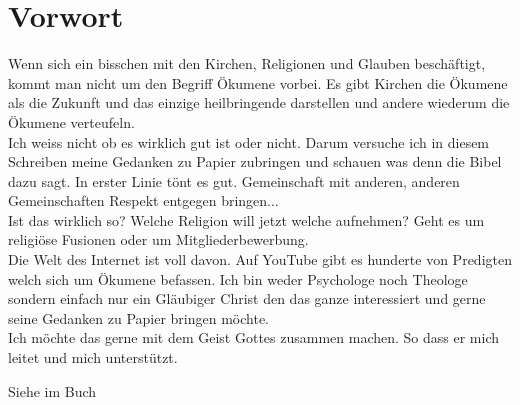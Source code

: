 \section{Vorwort}

Wenn sich ein bisschen mit den Kirchen, Religionen und Glauben beschäftigt, kommt man nicht um den Begriff Ökumene vorbei. Es gibt Kirchen die Ökumene als die Zukunft und das einzige heilbringende darstellen und andere wiederum die Ökumene verteufeln.\\
Ich weiss nicht ob es wirklich gut ist oder nicht. Darum versuche ich in diesem Schreiben meine Gedanken zu Papier zubringen und schauen was denn die Bibel dazu sagt. In erster Linie tönt es gut. Gemeinschaft mit anderen, anderen Gemeinschaften Respekt entgegen bringen...\\
Ist das wirklich so? Welche Religion will jetzt welche aufnehmen? Geht es um religiöse Fusionen oder um Mitgliederbewerbung. \\ 
Die Welt des Internet ist voll davon. Auf YouTube gibt es hunderte von Predigten welch sich um Ökumene befassen. Ich bin weder Psychologe noch Theologe sondern einfach nur ein Gläubiger Christ den das ganze interessiert und gerne seine Gedanken zu Papier bringen möchte.\\
Ich möchte das gerne mit dem Geist Gottes zusammen machen. So dass er mich leitet und mich unterstützt.


Siehe im Buch \parencite{May:1}


